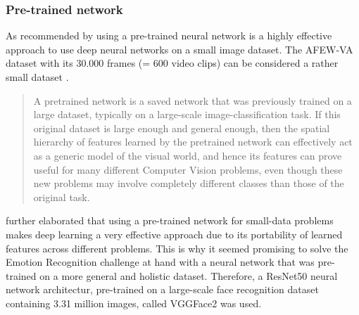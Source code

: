 \subsubsection{Pre-trained network}
As recommended by \citet{Chollet:2017:DeepLearningPython} using a pre-trained neural network is a highly effective approach to use deep neural networks on a small image dataset. The AFEW-VA dataset with its 30.000 frames (= 600 video clips) can be considered a rather small dataset \citep{Kossaifi:2017:AFEW-VADatabase}.

\begin{quote}
    A pretrained network is a saved network that was previously trained on a large dataset, typically on a large-scale image-classification task. If this original dataset is large enough and general enough, then the spatial hierarchy of features learned by the pretrained network can effectively act as a generic model of the visual world, and hence its features can prove useful for many different Computer Vision problems, even though these new problems may involve completely different classes than those of the original task. \citep[~p. 143]{Chollet:2017:DeepLearningPython}
\end{quote}

\citet{Chollet:2017:DeepLearningPython} further elaborated that using a pre-trained network for small-data problems makes deep learning a very effective approach due to its portability of learned features across different problems.
\newline\newline
This is why it seemed promising to solve the Emotion Recognition challenge at hand with a neural network that was pre-trained on a more general and holistic dataset. Therefore, a ResNet50 neural network architectur, pre-trained on a large-scale face recognition dataset containing 3.31 million images, called VGGFace2 \citep{Cao:2018:VGGFace2} was used.


